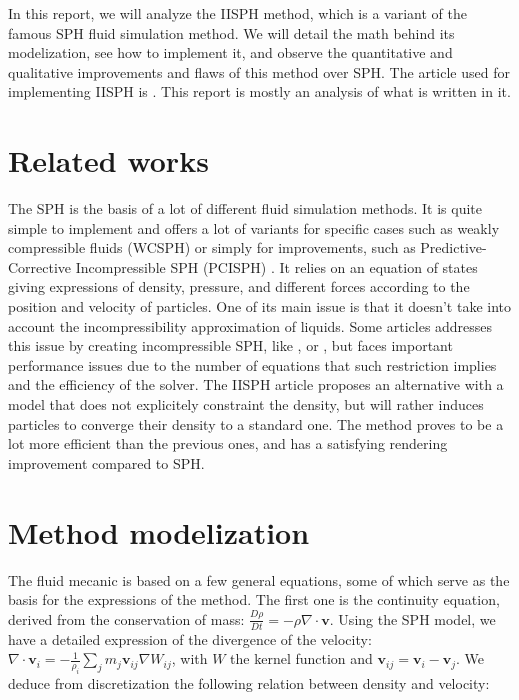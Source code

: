\documentclass[acmtog, authorversion]{acmart}
\begin{document}
In this report, we will analyze the IISPH method, which is a variant of the famous SPH fluid simulation method.
We will detail the math behind its modelization, see how to implement it, and observe the quantitative and qualitative improvements and flaws of this method over SPH.
The article used for implementing IISPH is \cite{IISPH}. This report is mostly an analysis of what is written in it.

\section{Related works}

The SPH \cite{SPH} is the basis of a lot of different fluid simulation methods. It is quite simple to implement and offers a lot of variants for specific cases such as weakly compressible fluids (WCSPH) \cite{WCSPH} or simply for improvements, such as Predictive-Corrective Incompressible SPH (PCISPH) \cite{PCISPH}.
It relies on an equation of states giving expressions of density, pressure, and different forces according to the position and velocity of particles. One of its main issue is that it doesn't take into account the incompressibility approximation of liquids.
Some articles addresses this issue by creating incompressible SPH, like \cite{PCISPH}, \cite{ISPH} or \cite{ISPHbis}, but faces important performance issues due to the number of equations that such restriction implies and the efficiency of the solver.
The IISPH article \cite{IISPH} proposes an alternative with a model that does not explicitely constraint the density, but will rather induces particles to converge their density to a standard one.
The method proves to be a lot more efficient than the previous ones, and has a satisfying rendering improvement compared to SPH.

\section{Method modelization}

The fluid mecanic is based on a few general equations, some of which serve as the basis for the expressions of the method.
The first one is the continuity equation, derived from the conservation of mass: $\frac{D\rho}{Dt} = -\rho\nabla \cdot \textbf{v}$.
Using the SPH model, we have a detailed expression of the divergence of the velocity: $\nabla \cdot \textbf{v}_{i} = -\frac{1}{\rho_{i}}\sum_{j}m_{j}\textbf{v}_{ij}\nabla W_{ij}$, with $W$ the kernel function and $\textbf{v}_{ij} = \textbf{v}_{i} - \textbf{v}_{j}$.
We deduce from discretization the following relation between density and velocity:
\end{document}
